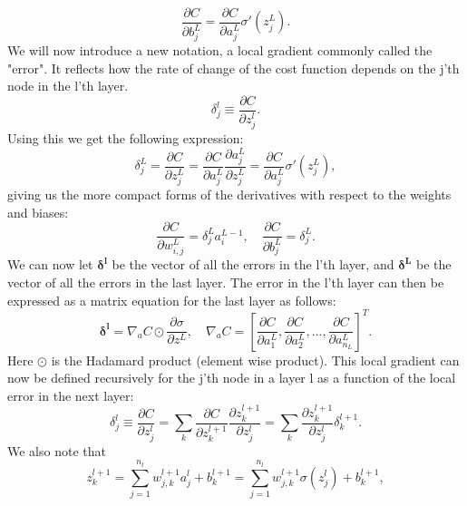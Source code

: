 \begin{equation*}
    \frac{\partial C}{\partial b_j^L} = \frac{\partial C}{\partial a_j^L}\sigma'(z_j^L). 
\end{equation*}
We will now introduce a new notation, a local gradient commonly called the "error". It reflects how the rate of change of the cost function depends on the j'th node in the l'th layer.
\begin{equation*}
    \delta_j^l \equiv \frac{\partial C}{\partial z_j^l}.  
\end{equation*}
Using this we get the following expression:
\begin{equation*}
    \delta_j^L=  \frac{\partial C}{\partial z_j^L} = \frac{\partial C}{\partial a_j^L}\frac{\partial a_j^L}{\partial z_j^L} = \frac{\partial C}{\partial a_j^L}\sigma'(z_j^L),
\end{equation*}
giving us the more compact forms of the derivatives with respect to the weights and biases:
\begin{equation*}
    \frac{\partial C}{\partial w_{i,j}^L} = \delta_j^La_i^{L-1}, \quad \frac{\partial C}{\partial b_j^L} = \delta_j^L.
\end{equation*}
We can now let $\boldsymbol{\delta^l}$ be the vector of all the errors in the l'th layer, and $\boldsymbol{\delta^L}$ be the vector of all the errors in the last layer. 
The error in the l'th layer can then be expressed as a matrix equation for the last layer as follows:
\begin{equation*}
    \boldsymbol{\delta^l} = \nabla_aC \odot \frac{\partial \sigma}{\partial z^L}, \quad \nabla_aC = \left[\frac{\partial C}{\partial a_1^L}, \frac{\partial C}{\partial a_2^L}, ..., \frac{\partial C}{\partial a_{n_L}^L} \right]^T.
\end{equation*}
Here $\odot$ is the Hadamard product (element wise product). This local gradient can now be defined recursively for the j'th node in a layer l as a function of the local error in the next layer:
\begin{equation}
    \label{eq:localgradient}
    \delta_j^l \equiv \frac{\partial C}{\partial z_j^l} = \sum_k \frac{\partial C}{\partial z_k^{l+1}}\frac{\partial z_k^{l+1}}{\partial z_j^l} = \sum_k \frac{\partial z_k^{l+1}}{\partial z_j^l} \delta_k^{l+1}.
\end{equation}
We also note that 
\begin{equation*}
    z_k^{l+1} = \sum_{j=1}^{n_l} w_{j,k}^{l+1}a_j^l + b_k^{l+1} = \sum_{j=1}^{n_l} w_{j,k}^{l+1}\sigma(z_j^l) + b_k^{l+1},
\end{equation*} 
